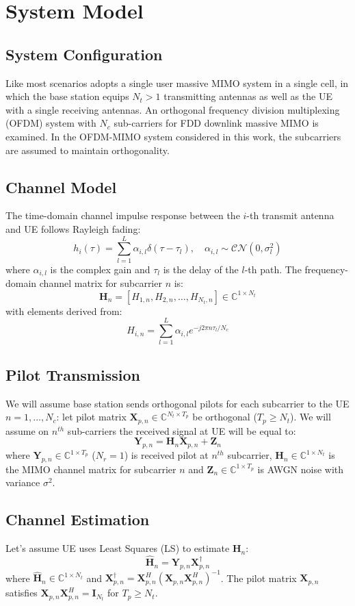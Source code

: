 \documentclass[lettersize,journal]{IEEEtran}
\begin{document}
\section{System Model}
\label{sec:system_model}

\subsection{System Configuration}
Like most scenarios adopts a single user massive MIMO system in a single cell, in which the base station equips $N_{t} > 1$ transmitting antennas as well as the UE with a single receiving antennas. An orthogonal frequency division multiplexing (OFDM) system with $N_{c}$ sub-carriers for FDD downlink massive MIMO is examined. In the OFDM-MIMO system considered in this work, the subcarriers are assumed to maintain orthogonality.

\subsection{Channel Model}
The time-domain channel impulse response between the $i$-th transmit antenna and UE follows Rayleigh fading:
\[
h_i(\tau) = \sum_{l=1}^L \alpha_{i,l} \delta(\tau-\tau_l), \quad \alpha_{i,l} \sim \mathcal{CN}(0,\sigma_l^2)
\]
where $\alpha_{i,l}$ is the complex gain and $\tau_l$ is the delay of the $l$-th path. The frequency-domain channel matrix for subcarrier $n$ is:
\[
\mathbf{H}_n = \left[H_{1,n}, H_{2,n}, \dots, H_{N_t,n}\right] \in \mathbb{C}^{1 \times N_t}
\]
with elements derived from:
\[
H_{i,n} = \sum_{l=1}^L \alpha_{i,l} e^{-j2\pi n \tau_l/N_c}
\]

\subsection{Pilot Transmission}
We will assume base station sends orthogonal pilots for each subcarrier to the UE $n=1,...,N_{c}$: let pilot matrix $\mathbf{X}_{p,n}\in \mathbb{C}^{N_{t}\times T_{p}}$ be orthogonal ($T_{p} \geq N_{t}$). We will assume on $n^{th}$ sub-carriers the received signal at UE will be equal to: 
\[
\mathbf{Y}_{p,n}=\mathbf{H}_{n}\mathbf{X}_{p,n}+\mathbf{Z}_{n} 
\]
where $\mathbf{Y}_{p,n} \in \mathbb{C}^{1\times T_{p}}$ ($N_{r}=1$) is received pilot at $n^{th}$ subcarrier, $\mathbf{H}_{n} \in \mathbb{C}^{1\times N_{t}}$ is the MIMO channel matrix for subcarrier $n$ and $\mathbf{Z}_{n}\in \mathbb{C}^{1\times T_{p}}$ is AWGN noise with variance $\sigma^{2}$.

\subsection{Channel Estimation}
Let's assume UE uses Least Squares (LS) to estimate $\mathbf{H}_{n}$:
\[
\hat{\mathbf{H}}_{n}=\mathbf{Y}_{p,n}\mathbf{X}^{\dag}_{p,n}
\]
where $\hat{\mathbf{H}}_{n} \in \mathbb{C}^{1\times N_{t}}$ and $\mathbf{X}_{p,n}^{\dag}= \mathbf{X}^{H}_{p,n}(\mathbf{X}_{p,n}\mathbf{X}^{H}_{p,n})^{-1}$. The pilot matrix $\mathbf{X}_{p,n}$ satisfies $\mathbf{X}_{p,n} \mathbf{X}_{p,n}^H = \mathbf{I}_{N_t}$ for $T_p \geq N_t$.
\end{document}
